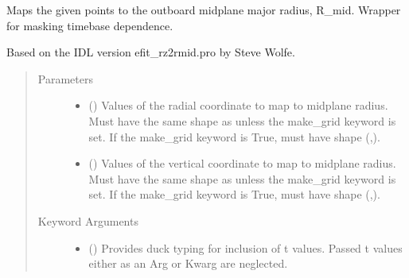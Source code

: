 \documentclass[letterpaper,10pt,english]{sphinxmanual}
\begin{document}
\begin{fulllineitems}
\begin{fulllineitems}
\end{fulllineitems}


\begin{fulllineitems}
\label{\detokenize{eqtools:eqtools.eqdskreader.EqdskReader.rz2rmid}}
Maps the given points to the outboard midplane major radius, R\_mid.
Wrapper for
{\hyperref[\detokenize{eqtools:eqtools.core.Equilibrium.rz2rmid}]{}}
masking timebase dependence.

Based on the IDL version efit\_rz2rmid.pro by Steve Wolfe.
\begin{quote}\begin{description}
\item[{Parameters}] \leavevmode\begin{itemize}
\item {} 
 () \textendash{} Values of the radial coordinate to
map to midplane radius. Must have the same shape as  unless
the make\_grid keyword is set. If the make\_grid keyword is True,
 must have shape (,).

\item {} 
 () \textendash{} Values of the vertical coordinate to
map to midplane radius. Must have the same shape as  unless
the make\_grid keyword is set. If the make\_grid keyword is True,
 must have shape (,).

\end{itemize}

\item[{Keyword Arguments}] \leavevmode\begin{itemize}
\item {} 
 () \textendash{} Provides duck typing for inclusion of t values.
Passed t values either as an Arg or Kwarg are neglected.


\end{itemize}
\end{description}
\end{quote}
\end{fulllineitems}
\end{fulllineitems}
\end{document}
